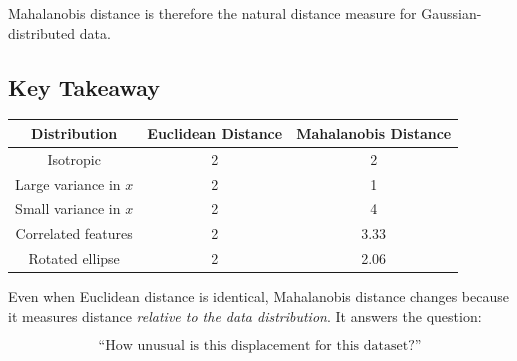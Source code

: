\documentclass{article}
\begin{document}
Mahalanobis distance is therefore the natural distance measure for
Gaussian-distributed data.

\subsection*{Key Takeaway}

\begin{center}
\begin{tabular}{c|c|c}
Distribution & Euclidean Distance & Mahalanobis Distance\\
\hline
Isotropic & 2 & 2\\
Large variance in $x$ & 2 & 1\\
Small variance in $x$ & 2 & 4\\
Correlated features & 2 & 3.33\\
Rotated ellipse & 2 & 2.06
\end{tabular}
\end{center}

\bigskip

Even when Euclidean distance is identical, Mahalanobis distance changes
because it measures distance \textit{relative to the data distribution}.
It answers the question:

\[
\text{``How unusual is this displacement for this dataset?''}
\]




\end{document}
